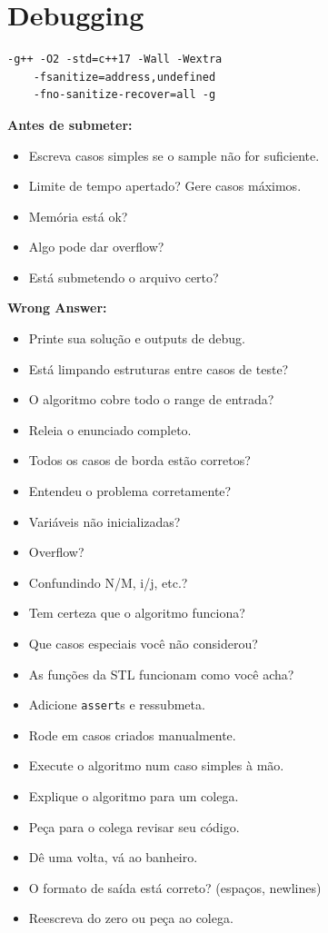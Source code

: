 \setlength{\parindent}{0pt}
\section{Debugging}

\vspace{-10pt}

{\fontsize{7}{9}\selectfont
\begin{verbatim}
-g++ -O2 -std=c++17 -Wall -Wextra
    -fsanitize=address,undefined
    -fno-sanitize-recover=all -g
\end{verbatim}
}

\vspace{-8pt}

\textbf{Antes de submeter:}
{\fontsize{6.5}{8}\selectfont
\begin{itemize}[noitemsep,topsep=2pt,leftmargin=*]
\item Escreva casos simples se o sample não for suficiente.
\item Limite de tempo apertado? Gere casos máximos.
\item Memória está ok?
\item Algo pode dar overflow?
\item Está submetendo o arquivo certo?
\end{itemize}
}

\textbf{Wrong Answer:}
{\fontsize{6.5}{8}\selectfont
\begin{itemize}[noitemsep,topsep=2pt,leftmargin=*]
\item Printe sua solução e outputs de debug.
\item Está limpando estruturas entre casos de teste?
\item O algoritmo cobre todo o range de entrada?
\item Releia o enunciado completo.
\item Todos os casos de borda estão corretos?
\item Entendeu o problema corretamente?
\item Variáveis não inicializadas?
\item Overflow?
\item Confundindo N/M, i/j, etc.?
\item Tem certeza que o algoritmo funciona?
\item Que casos especiais você não considerou?
\item As funções da STL funcionam como você acha?
\item Adicione \texttt{assert}s e ressubmeta.
\item Rode em casos criados manualmente.
\item Execute o algoritmo num caso simples à mão.
\item Explique o algoritmo para um colega.
\item Peça para o colega revisar seu código.
\item Dê uma volta, vá ao banheiro.
\item O formato de saída está correto? (espaços, newlines)
\item Reescreva do zero ou peça ao colega.
\end{itemize}
}

